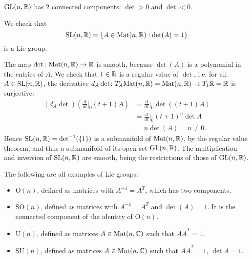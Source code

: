    \begin{remark}
 $\operatorname{GL}(n, \mathbb{R})$ has 2 connected components: $\det > 0$ and $\det < 0$. 
\end{remark}
\begin{eg}    We check that
    $$\operatorname{SL} (n, \mathbb{R})= \{A \in \text{Mat}(n, \mathbb{R}): \det(A)=1\}$$ is a Lie group. 

 The map $\det: \text{Mat}(n, \mathbb{R})\to \mathbb{R}$ is smooth, because $\det(A)$ is a polynomial in the entries of $A$. We check that $1\in \mathbb{R}$ is a regular value of $\det$, i.e. for all $A\in \operatorname{SL} (n, \mathbb{R})$, the derivative
   $d_A \det\colon T_A \text{Mat}(n, \mathbb{R})=\text{Mat}(n, \mathbb{R}) \to T_1\mathbb{R}=\mathbb{R}$ is surjective:
    \begin{align*}
        (d_A \det) \left( \frac{d}{dt}\Big|_0 (t+1) A \right) &= \frac{d}{dt}\Big|_0 \det((t+1)A)\\
          &= \frac{d}{dt}\Big|_0  (t+1)^{n } \det A \\
          &= n \det (A) =n \neq 0.
    \end{align*} 
Hence  $\operatorname{SL}(n, \mathbb{R})=\det^{-1}(\{1\})$ is a submanifold of $\operatorname{Mat}(n, \mathbb{R})$, by
the regular value theorem, and thus a  submanifold of its open set  $\operatorname{GL}(n, \mathbb{R})$. 
The multiplication and inversion of  $\operatorname{SL}(n, \mathbb{R})$ are smooth, being the restrictions of those of $\operatorname{GL}(n, \mathbb{R})$.\end{eg}


\begin{eg} The following are all examples of Lie groups:
    \begin{itemize}
        \item $\text{O}(n)$, defined as matrices with $A^{-1} = A^{T}$, which has two components.
        \item $\text{SO}(n)$, defined as  matrices with $A^{-1} = A^{T}$ and  $\det(A) = 1$. It is the connected component  of the identity of $\text{O}(n)$. 
        \item $\text{U}(n)$, defined as matrices $A \in \operatorname{Mat} (n, \mathbb{C})$ such that  $A \overline{A}^{T} = 1$.
        \item $\text{SU}(n)$, defined as matrices $A \in \operatorname{Mat} (n, \mathbb{C})$ such that   $A \overline{A}^{T} = 1$,  $\det A = 1$.
    \end{itemize}
\end{eg}



